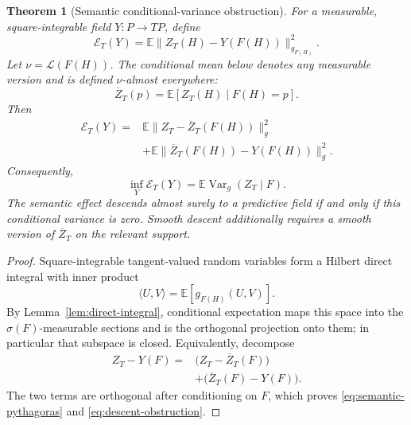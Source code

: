 \documentclass[11pt]{article}
\newtheorem{theorem}{Theorem}[section]
\theoremstyle{definition}
\theoremstyle{remark}
\newcommand{\E}{\mathbb{E}}
\newcommand{\Var}{\operatorname{Var}}
\begin{document}
\begin{theorem}[Semantic conditional-variance obstruction]\label{thm:semantic-obstruction}
For a measurable, square-integrable field $Y:P\to TP$, define
\begin{equation}
    \mathcal E_T(Y)=\E\|Z_T(H)-Y(F(H))\|_{g_{F(H)}}^2.
\end{equation}
Let $\nu=\mathcal L(F(H))$. The conditional mean below denotes any measurable
version and is defined $\nu$-almost everywhere:
\begin{equation}
    \overline Z_T(p)=\E[Z_T(H)\mid F(H)=p].
\end{equation}
Then
\begin{equation}
\begin{split}
    \mathcal E_T(Y)
    ={}&\E\|Z_T-\overline Z_T(F(H))\|_g^2\\
    &+\E\|\overline Z_T(F(H))-Y(F(H))\|_g^2.
\end{split}
\label{eq:semantic-pythagoras}
\end{equation}
Consequently,
\begin{equation}
    \inf_Y\mathcal E_T(Y)
    =\E\Var_g(Z_T\mid F).
    \label{eq:descent-obstruction}
\end{equation}
The semantic effect descends almost surely to a predictive field if and only if this conditional variance is zero. Smooth descent additionally requires a smooth version of $\overline Z_T$ on the relevant support.
\end{theorem}

\begin{proof}
Square-integrable tangent-valued random variables form a Hilbert direct integral with inner product
\begin{equation}
    \langle U,V\rangle=\E[g_{F(H)}(U,V)].
\end{equation}
By Lemma~\ref{lem:direct-integral}, conditional expectation maps this space into the $\sigma(F)$-measurable sections and is the orthogonal projection onto them; in particular that subspace is closed. Equivalently, decompose
\begin{equation}
\begin{split}
    Z_T-Y(F)
    ={}&\bigl(Z_T-\overline Z_T(F)\bigr)\\
    &+\bigl(\overline Z_T(F)-Y(F)\bigr).
\end{split}
\end{equation}
The two terms are orthogonal after conditioning on $F$, which proves \eqref{eq:semantic-pythagoras} and \eqref{eq:descent-obstruction}.
\end{proof}
\end{document}
